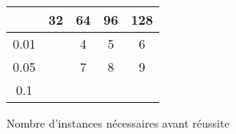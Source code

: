 \documentclass{article}		%
\theoremstyle{definition}
\theoremstyle{plain}
\theoremstyle{plain}
\theoremstyle{plain}
\theoremstyle{plain}
\theoremstyle{plain}
\begin{document}
\begin{figure}
\caption{Nombre d'instances nécessaires avant réussite}
\begin{center}
\begin{tabular}{|c |c | c | c | c | }
\hline
   & 32 & 64 & 96 & 128 \\
\hline
 0.01  & &4 & 5 & 6 \\
\hline
  0.05 & &7 & 8 & 9 \\
\hline
 0.1 & & & & \\
 \hline
 \end{tabular}
\end{center}
\end{figure}



\end{document}
